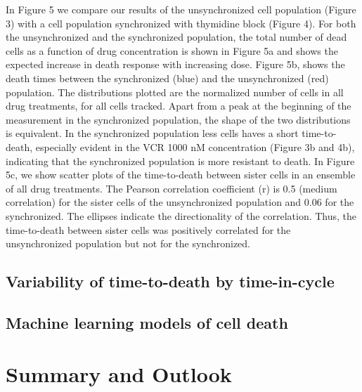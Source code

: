 \documentclass[pdftex,12pt,a4paper]{report}
\begin{document}
In Figure 5 we compare our results of the unsynchronized cell population (Figure 3) with a cell population synchronized with thymidine block (Figure 4). For both the unsynchronized and the synchronized population, the total number of dead cells as a function of drug concentration is shown in Figure 5a and shows the expected increase in death response with increasing dose. Figure 5b, shows the death times between the synchronized (blue) and the unsynchronized (red) population. The distributions plotted are the normalized number of cells in all drug treatments, for all cells tracked. Apart from a peak at the beginning of the measurement in the synchronized population, the shape of the two distributions is equivalent. In the synchronized population less cells haves a short time-to-death, especially evident in the VCR 1000 nM concentration (Figure 3b and 4b), indicating that the synchronized population is more resistant to death. In Figure 5c, we show scatter plots of the time-to-death between sister cells in an ensemble of all drug treatments. The Pearson correlation coefficient (r) is 0.5 (medium correlation) for the sister cells of the unsynchronized population and 0.06 for the synchronized. The ellipses indicate the directionality of the correlation. Thus, the time-to-death between sister cells was positively correlated for the unsynchronized population but not for the synchronized.

\section{Variability of time-to-death by time-in-cycle}


\section{Machine learning models of cell death}
\label{section:ml_results}


\chapter{Summary and Outlook}
\end{document}
